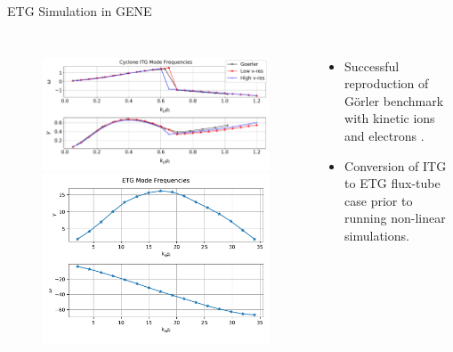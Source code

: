 \documentclass[aspectratio=43]{beamer}
\begin{document}
   \begin{frame}{ETG Simulation in GENE}
      \begin{columns}
         \begin{figure}
            \includegraphics[width=.8\textwidth, height=.35\textheight]{Images/LinearITG_KinEl_GrowthRates.pdf}
            \\
            \includegraphics[width=.8\textwidth, height=.45\textheight]{Images/GrowthRates_ETG.pdf}
         \end{figure}
         \begin{itemize}
            \item Successful reproduction of G\"{o}rler benchmark with kinetic ions and electrons \cite{Gorler}.
            \vspace{10mm}
            \item Conversion of ITG to ETG flux-tube case prior to running non-linear simulations.
         \end{itemize}
      \end{columns}
   \end{frame}
\end{document}
